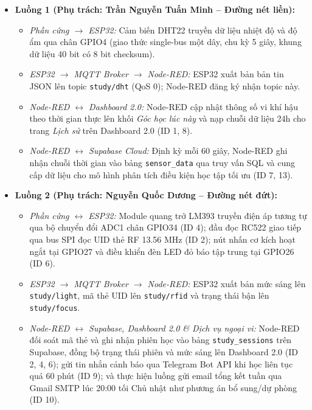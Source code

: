 \begin{itemize}[leftmargin=0.8cm, noitemsep, topsep=2pt]
    \item \textbf{Luồng 1 (Phụ trách: Trần Nguyễn Tuấn Minh -- Đường nét liền):}
    \begin{itemize}[leftmargin=0.5cm, noitemsep]
        \item \textit{Phần cứng $\rightarrow$ ESP32:} Cảm biến DHT22 truyền dữ liệu nhiệt độ và độ ẩm qua chân GPIO4 (giao thức single-bus một dây, chu kỳ 5 giây, khung dữ liệu 40 bit có 8 bit checksum).
        \item \textit{ESP32 $\rightarrow$ MQTT Broker $\rightarrow$ Node-RED:} ESP32 xuất bản bản tin JSON lên topic \texttt{study/dht} (QoS 0); Node-RED đăng ký nhận topic này.
        \item \textit{Node-RED $\leftrightarrow$ Dashboard 2.0:} Node-RED cập nhật thông số vi khí hậu theo thời gian thực lên khối \textit{Góc học lúc này} và nạp chuỗi dữ liệu 24h cho trang \textit{Lịch sử} trên Dashboard 2.0 (ID 1, 8).
        \item \textit{Node-RED $\leftrightarrow$ Supabase Cloud:} Định kỳ mỗi 60 giây, Node-RED ghi nhận chuỗi thời gian vào bảng \texttt{sensor\_data} qua truy vấn SQL và cung cấp dữ liệu cho mô hình phân tích điều kiện học tập tối ưu (ID 7, 13).
    \end{itemize}
    
    \item \textbf{Luồng 2 (Phụ trách: Nguyễn Quốc Dương -- Đường nét đứt):}
    \begin{itemize}[leftmargin=0.5cm, noitemsep]
        \item \textit{Phần cứng $\leftrightarrow$ ESP32:} Module quang trở LM393 truyền điện áp tương tự qua bộ chuyển đổi ADC1 chân GPIO34 (ID 4); đầu đọc RC522 giao tiếp qua bus SPI đọc UID thẻ RF 13.56 MHz (ID 2); nút nhấn cơ kích hoạt ngắt tại GPIO27 và điều khiển đèn LED đỏ báo tập trung tại GPIO26 (ID 6).
        \item \textit{ESP32 $\rightarrow$ MQTT Broker $\rightarrow$ Node-RED:} ESP32 xuất bản mức sáng lên \texttt{study/light}, mã thẻ UID lên \texttt{study/rfid} và trạng thái bận lên \texttt{study/focus}.
        \item \textit{Node-RED $\leftrightarrow$ Supabase, Dashboard 2.0 \& Dịch vụ ngoại vi:} Node-RED đối soát mã thẻ và ghi nhận phiên học vào bảng \texttt{study\_sessions} trên Supabase, đồng bộ trạng thái phiên và mức sáng lên Dashboard 2.0 (ID 2, 4, 6); gửi tin nhắn cảnh báo qua Telegram Bot API khi học liên tục quá 60 phút (ID 9); và thực hiện luồng gửi email tổng kết tuần qua Gmail SMTP lúc 20:00 tối Chủ nhật như phương án bổ sung/dự phòng (ID 10).
    \end{itemize}
    

\end{itemize}
